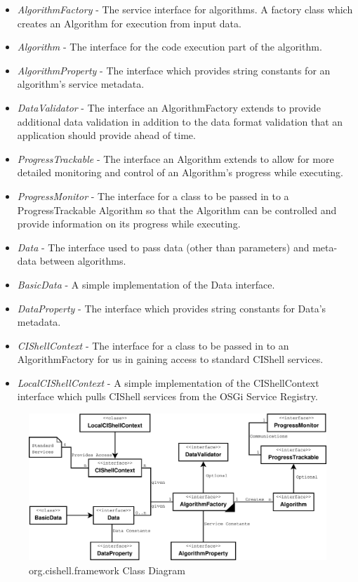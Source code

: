 \begin{itemize}
  \item \textit{AlgorithmFactory} - The service interface for algorithms.
  A factory class which creates an Algorithm for execution from input data.
  \item \textit{Algorithm} - The interface for the code execution part of the
  algorithm.
  \item \textit{AlgorithmProperty} - The interface which provides string
  constants for an algorithm's service metadata.
  \item \textit{DataValidator} - The interface an AlgorithmFactory extends to
  provide additional data validation in addition to the data format validation
  that an application should provide ahead of time.
  \item \textit{ProgressTrackable} - The interface an Algorithm extends to allow
  for more detailed monitoring and control of an Algorithm's progress while
  executing.
  \item \textit{ProgressMonitor} - The interface for a class to be passed in to
  a ProgressTrackable Algorithm so that the Algorithm can be controlled
  and provide information on its progress while executing.
  \item \textit{Data} - The interface used to pass data (other than
  parameters) and meta-data between algorithms.
  \item \textit{BasicData} - A simple implementation of the Data interface. 
  \item \textit{DataProperty} - The interface which provides string constants
  for Data's metadata.
  \item \textit{CIShellContext} - The interface for a class to be passed in to
  an AlgorithmFactory for us in gaining access to standard CIShell services.
  \item \textit{LocalCIShellContext} - A simple implementation of the
  CIShellContext interface which pulls CIShell services from the OSGi Service
  Registry.
\end{itemize}

\begin{figure}[htb!]
\centering
\includegraphics[width=150mm]{../img/cishellInteraction.pdf}
\caption{org.cishell.framework Class Diagram}
\label{fig:cishellInteraction}
\end{figure}

